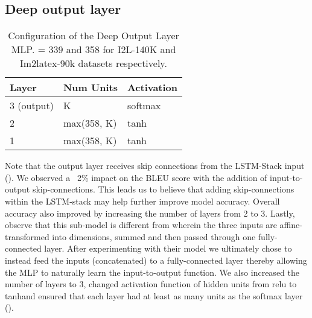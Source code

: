 \documentclass{article}
\begin{document}
\subsection{Deep output layer}
\label{output-comments}
\begin{wraptable}{r}{0.5\textwidth}
	\caption[Output Layer Configuration]{Configuration of the Deep Output Layer MLP.  = 339 and 358 for I2L-140K and Im2latex-90k datasets respectively.}
	\begin{tabular}{lll}
		\textbf{Layer} & \textbf{Num Units} & \textbf{Activation}\\
		\hline
		3 (output) & K & softmax \\
		2 & max(358, K) & tanh \\
		1 & max(358, K) & tanh
	\end{tabular}
	\centering
	\label{table-output-layer}
\end{wraptable}
Note that the output layer receives skip connections from the LSTM-Stack input (). We observed a ~2\% impact on the BLEU score with the addition of input-to-output skip-connections. This leads us to believe that adding skip-connections within the LSTM-stack may help further improve model accuracy. Overall accuracy also improved by increasing the number of layers from 2 to 3. Lastly, observe that this sub-model is different from \citet{Xu2015ShowAA} wherein the three inputs are affine-transformed into  dimensions, summed and then passed through one fully-connected layer. After experimenting with their model we ultimately chose to instead feed the inputs (concatenated) to a fully-connected layer thereby allowing the MLP to naturally learn the input-to-output function. We also increased the number of layers to 3, changed activation function of hidden units from relu to tanh\footnotemark[101] and ensured that each layer had at least as many units as the softmax layer ().
\end{document}
